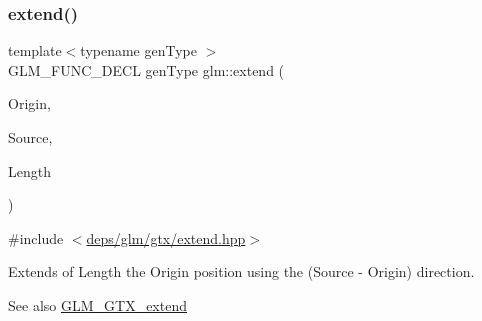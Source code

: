 \subsubsection{\texorpdfstring{extend()}{extend()}}
{\footnotesize\ttfamily template$<$typename gen\+Type $>$ \\
G\+L\+M\+\_\+\+F\+U\+N\+C\+\_\+\+D\+E\+CL gen\+Type glm\+::extend (\begin{DoxyParamCaption}\item[{gen\+Type const \&}]{Origin,  }\item[{gen\+Type const \&}]{Source,  }\item[{typename gen\+Type\+::value\+\_\+type const}]{Length }\end{DoxyParamCaption})}



{\ttfamily \#include $<$\hyperlink{extend_8hpp}{deps/glm/gtx/extend.\+hpp}$>$}

Extends of Length the Origin position using the (Source -\/ Origin) direction. \begin{DoxySeeAlso}{See also}
\hyperlink{group__gtx__extend}{G\+L\+M\+\_\+\+G\+T\+X\+\_\+extend} 
\end{DoxySeeAlso}
